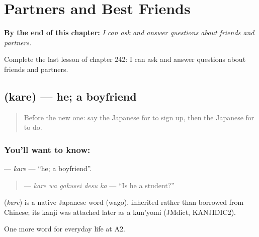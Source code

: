 
\chapter{Partners and Best Friends}
\label{ch:ja-partners-and-best-friends}

\begin{chapteropening}
\textbf{By the end of this chapter:} \emph{I can ask and answer questions about friends and partners.}

Complete the last lesson of chapter 242: I can ask and answer questions about friends and partners.
\end{chapteropening}

\section[\texorpdfstring{\ja{かれ} (kare)}{かれ (kare)}]{ (kare) — he; a boyfriend}

\label{lesson:JA-C242-kare}



\begin{quote}
Before the new one: say the Japanese for to sign up, then the Japanese for to do.
\end{quote}

\subsection*{You'll want to know: }
\textbf{} — \emph{kare} — \textquotedblleft{}he; a boyfriend\textquotedblright{}.

\begin{quote}
\textbf{ } — \emph{kare wa gakusei desu ka} — \textquotedblleft{}Is he a student?\textquotedblright{}
\end{quote}

\begin{cousinweb}
\textbf{} (\emph{kare}) is a native Japanese word (wago), inherited rather than borrowed from Chinese; its kanji was attached later as a kun'yomi (JMdict, KANJIDIC2).
\end{cousinweb}

\begin{grammarlens}[title={What you've built}]
One more word for everyday life at A2.
\end{grammarlens}

